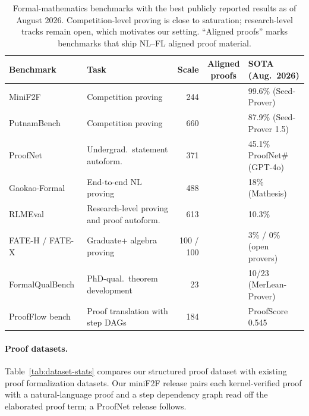 \documentclass[sigconf,anonymous]{aamas}
\newcommand{\yes}{\ding{51}} %
\newcommand{\no}{\ding{55}}
\begin{document}
\begin{table}[H]
  \centering
  \small
  \caption{Formal-mathematics benchmarks with the best publicly reported results
  as of August 2026. Competition-level proving is close to saturation;
  research-level tracks remain open, which motivates our setting. ``Aligned
  proofs'' marks benchmarks that ship NL--FL aligned proof material.}
  \label{tab:benchmarks}
  \begin{tabular}{@{}p{2.5cm}p{4.2cm}rcp{3.6cm}@{}}
    \toprule
    Benchmark & Task & Scale & Aligned proofs & SOTA (Aug.\ 2026) \\
    \midrule
    MiniF2F~\citep{minif2f2022} & Competition proving & 244 & \no &
      99.6\% (Seed-Prover) \\
    PutnamBench~\citep{putnambench2024} & Competition proving & 660 & \no &
      87.9\% (Seed-Prover 1.5) \\
    ProofNet~\citep{proofnet2023} & Undergrad.\ statement autoform. & 371 & \no &
      45.1\% ProofNet\# (GPT-4o) \\
    Gaokao-Formal~\citep{mathesis2025} & End-to-end NL proving & 488 & \no &
      18\% (Mathesis) \\
    RLMEval~\citep{rlmeval2025} & Research-level proving and proof autoform. &
      613 & \yes & 10.3\% \\
    FATE-H / FATE-X~\citep{fate2025} & Graduate+ algebra proving & 100 / 100 &
      \no & 3\% / 0\% (open provers) \\
    FormalQualBench~\citep{formalqualbench2026} & PhD-qual.\ theorem development
      & 23 & \no & 10/23 (MerLean-Prover) \\
    ProofFlow bench~\citep{proofflow2025} & Proof translation with step DAGs &
      184 & \yes & ProofScore 0.545 \\
    \bottomrule
  \end{tabular}
\end{table}

\paragraph{Proof datasets.} Table~\ref{tab:dataset-stats} compares our
structured proof dataset with existing proof formalization datasets. Our
miniF2F release pairs each kernel-verified proof with a natural-language proof
and a step dependency graph read off the elaborated proof term; a ProofNet
release follows.
\end{document}
